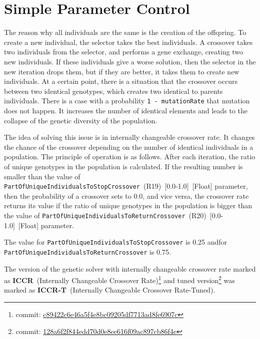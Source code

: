 \section{Simple Parameter Control}

The reason why all individuals are the same is the creation of the offspring. To create a new individual, the selector takes the best individuals. A crossover takes two individuals from the selector, and performs a gene exchange, creating two new individuals. If these individuals give a worse solution, then the selector in the new iteration drops them, but if they are better, it takes them to create new individuals. At a certain point, there is a situation that the crossover occurs between two identical genotypes, which creates two identical to parents individuals. There is a case with a probability \texttt{1~-~mutationRate} that mutation does not happen. It increases the number of identical elements and leads to the collapse of the genetic diversity of the population.

The idea of solving this issue is in internally changeable crossover rate. It changes the chance of the crossover depending on the number of identical individuals in a population. 
The principle of operation is as follows. After each iteration, the ratio of unique genotypes in the population is calculated. If the resulting number is smaller than the value of \texttt{PartOfUniqueIndividualsToStopCrossover}~(R19)~[0.0-1.0]~[Float] parameter, then the probability of a crossover sets to 0.0, and vice versa, the crossover rate returns its value if the ratio of unique genotypes in the population is bigger than the value of \texttt{PartOfUniqueIndividualsToReturnCrossover}~(R20)~[0.0-1.0]~[Float] parameter.

The value for \texttt{PartOfUniqueIndividualsToStopCrossover} is 0.25 and\linebreak for \texttt{PartOfUniqueIndividualsToReturnCrossover} is 0.75.


The version of the genetic solver with internally changeable crossover rate marked as \textbf{ICCR}~(Internally Changeable Crossover Rate)\footnote{commit: \href{https://git-st.inf.tu-dresden.de/mquat/mquat2/commit/c89422c6e46a5f4e8bc09205df7713ad8fe6907c}{c89422c6e46a5f4e8bc09205df7713ad8fe6907c}} and tuned version\footnote{commit: \href{https://git-st.inf.tu-dresden.de/mquat/mquat2/commit/128a6f2f844edd70d0e8ee616f09ac897cb86f4e}{128a6f2f844edd70d0e8ee616f09ac897cb86f4e}} was marked as \textbf{ICCR-T}~(Internally Changeable Crossover Rate-Tuned).

